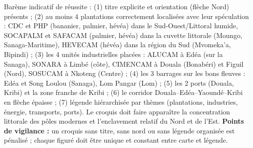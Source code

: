 \documentclass[11pt]{article}
\begin{document}
\begin{corrige}
Barème indicatif de réussite : (1) titre explicite et orientation (flèche Nord) présents ; (2) au moins 4 plantations correctement localisées avec leur spéculation : CDC et PHP (bananier, palmier, hévéa) dans le Sud-Ouest/Littoral humide, SOCAPALM et SAFACAM (palmier, hévéa) dans la cuvette littorale (Moungo, Sanaga-Maritime), HEVECAM (hévéa) dans la région du Sud (Mvomeka'a, Bipindi) ; (3) les 4 unités industrielles placées : ALUCAM à Edéa (sur la Sanaga), SONARA à Limbé (côte), CIMENCAM à Douala (Bonabéri) et Figuil (Nord), SOSUCAM à Nkoteng (Centre) ; (4) les 3 barrages sur les bons fleuves : Edéa et Song Loulou (Sanaga), Lom Pangar (Lom) ; (5) les 2 ports (Douala, Kribi) et la zone franche de Kribi ; (6) le corridor Douala--Edéa--Yaoundé--Kribi en flèche épaisse ; (7) légende hiérarchisée par thèmes (plantations, industries, énergie, transports, ports). Le croquis doit faire apparaître la concentration littorale des pôles modernes et l'enclavement relatif du Nord et de l'Est.
\textbf{Points de vigilance :} un croquis sans titre, sans nord ou sans légende organisée est pénalisé ; chaque figuré doit être unique et constant entre carte et légende.
\end{corrige}
\end{document}

